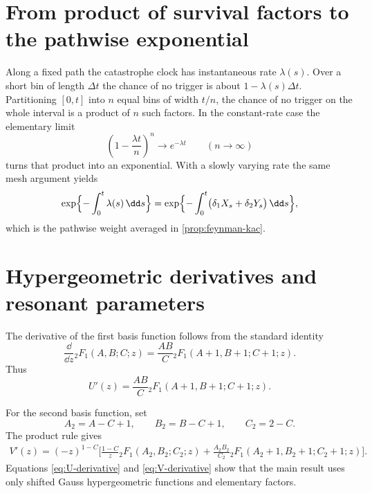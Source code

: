 
\begingroup
\renewcommand{\theHsection}{\thechapter.appendix.\Alph{section}}
\renewcommand{\theHsubsection}{\theHsection.\arabic{subsection}}
\renewcommand{\theHsubsubsection}{\theHsubsection.\arabic{subsubsection}}
\renewcommand{\thesection}{\thechapter.\Alph{section}}
\setcounter{section}{0}


\section{From product of survival factors to the pathwise exponential}
\label{app:product-to-exponential}

Along a fixed path the catastrophe clock has instantaneous rate $\lambda(s)$. Over a short bin of length $\Delta t$ the chance of no trigger is about $1-\lambda(s)\Delta t$. Partitioning $[0,t]$ into $n$ equal bins of width $t/n$, the chance of no trigger on the whole interval is a product of $n$ such factors. In the constant-rate case the elementary limit
\[
\left(1-\frac{\lambda t}{n}\right)^{n}\longrightarrow e^{-\lambda t}
\qquad(n\to\infty)
\]
turns that product into an exponential. With a slowly varying rate the same mesh argument yields
\[
\exp\Bigl\{-\int_0^t\lambda(s)\,\dd s\Bigr\}
=\exp\Bigl\{-\int_0^t\bigl(\delta_1X_s+\delta_2Y_s\bigr)\,\dd s\Bigr\},
\]
which is the pathwise weight averaged in \cref{prop:feynman-kac}.

\section{Hypergeometric derivatives and resonant parameters}
\label{app:hypergeometric-details}

The derivative of the first basis function follows from the standard identity
\[
\frac{\dd}{\dd z}{}_2F_1(A,B;C;z)
=\frac{AB}{C}{}_2F_1(A+1,B+1;C+1;z).
\]
Thus
\begin{equation}
\label{eq:U-derivative}
U'(z)=\frac{AB}{C}
{}_2F_1(A+1,B+1;C+1;z).
\end{equation}

For the second basis function, set
\begin{equation*}
A_2=A-C+1,
\qquad
B_2=B-C+1,
\qquad
C_2=2-C.
\end{equation*}
The product rule gives
\begin{equation}
\label{eq:V-derivative}
\begin{aligned}
V'(z)=(-z)^{1-C}\Biggl[
\frac{1-C}{z}{}_2F_1(A_2,B_2;C_2;z)
+\frac{A_2B_2}{C_2}
{}_2F_1(A_2+1,B_2+1;C_2+1;z)
\Biggr].
\end{aligned}
\end{equation}
Equations \eqref{eq:U-derivative} and \eqref{eq:V-derivative} show that the main result uses only shifted Gauss hypergeometric functions and elementary factors.

